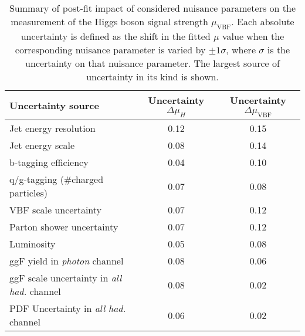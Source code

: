 \documentclass[PAPER, american,coverpage,texlive=2016, english]{\ATLASLATEXPATH atlasdoc}
\newcommand*{\muH}{\ensuremath{\mu_{H}}\xspace}
\newcommand*{\muVBF}{\ensuremath{\mu_{\text{VBF}}}\xspace}
\providecommand{\DIFaddbeginFL}{} %
\providecommand{\DIFaddendFL}{} %
\providecommand{\DIFdelbeginFL}{} %
\providecommand{\DIFdelendFL}{} %
\begin{document}
\begin{table}[htbp]
\centering
  \caption{Summary of post-fit impact of considered nuisance parameters on the measurement of the Higgs boson signal strength $\muVBF$. Each absolute uncertainty is defined as the shift in the fitted $\mu$ value when the corresponding nuisance parameter is varied by $\pm 1 \sigma$, where $\sigma$ is the uncertainty on that nuisance parameter.  The largest source of uncertainty in its kind is shown.}
    \label{tab:signalsyst}
\DIFdelbeginFL %
\DIFdelendFL \DIFaddbeginFL \begin{tabular}{l|cc}
    \DIFaddendFL \hline \DIFaddbeginFL \hline
\DIFaddendFL Uncertainty source                                                         & Uncertainty $\Delta \muH$ & \multicolumn{1}{c}{Uncertainty $\Delta \muVBF$} \\
    \hline
Jet energy resolution                                                      & 0.12                      & 0.15                                            \\
Jet energy scale                                                           & 0.08                      & 0.14                                            \\
b-tagging efficiency                                                       & 0.04                      & 0.10                                            \\
q/g-tagging (\#charged particles)                                          & 0.07                      & 0.08                                            \\
VBF scale uncertainty                                                      & 0.07                      & 0.12                                            \\
Parton shower uncertainty                                                  & 0.07                      & 0.12                                            \\
Luminosity                                                                 & 0.05                      & 0.08                                            \\
ggF yield in \textit{photon} channel                                       & 0.08                      & 0.06                                            \\
ggF scale uncertainty in \textit{all had.} channel                         & 0.08                      & 0.02                                            \\
PDF Uncertainty in \textit{all had.} channel                               & 0.06                      & 0.02                                            \\
     \hline \DIFaddbeginFL \hline
\DIFaddendFL \end{tabular}
\end{table}
\end{document}
